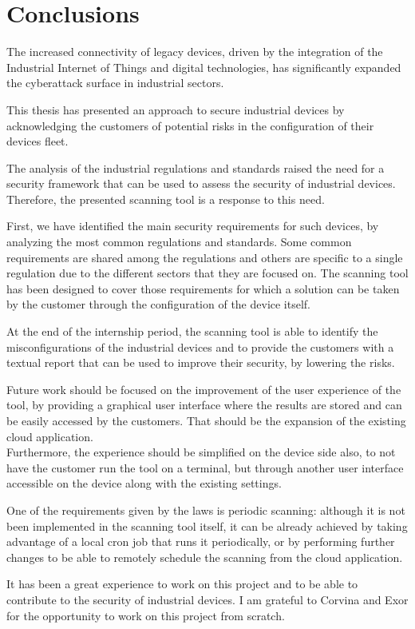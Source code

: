 \chapter{Conclusions}

The increased connectivity of legacy devices, driven by the integration of the Industrial Internet of Things and digital technologies, has significantly expanded the cyberattack surface in industrial sectors.

This thesis has presented an approach to secure industrial devices by acknowledging the customers of potential risks in the configuration of their devices fleet.

The analysis of the industrial regulations and standards raised the need for a security framework that can be used to assess the security of industrial devices. Therefore, the presented scanning tool is a response to this need.

First, we have identified the main security requirements for such devices, by analyzing the most common regulations and standards. Some common requirements are shared among the regulations and others are specific to a single regulation due to the different sectors that they are focused on. The scanning tool has been designed to cover those requirements for which a solution can be taken by the customer through the configuration of the device itself.

At the end of the internship period, the scanning tool is able to identify the misconfigurations of the industrial devices and to provide the customers with a textual report that can be used to improve their security, by lowering the risks.

Future work should be focused on the improvement of the user experience of the tool, by providing a graphical user interface where the results are stored and can be easily accessed by the customers. That should be the expansion of the existing cloud application.\\
Furthermore, the experience should be simplified on the device side also, to not have the customer run the tool on a terminal, but through another user interface accessible on the device along with the existing settings.

One of the requirements given by the laws is periodic scanning: although it is not been implemented in the scanning tool itself, it can be already achieved by taking advantage of a local cron job that runs it periodically, or by performing further changes to be able to remotely schedule the scanning from the cloud application.

It has been a great experience to work on this project and to be able to contribute to the security of industrial devices. I am grateful to Corvina and Exor for the opportunity to work on this project from scratch.
